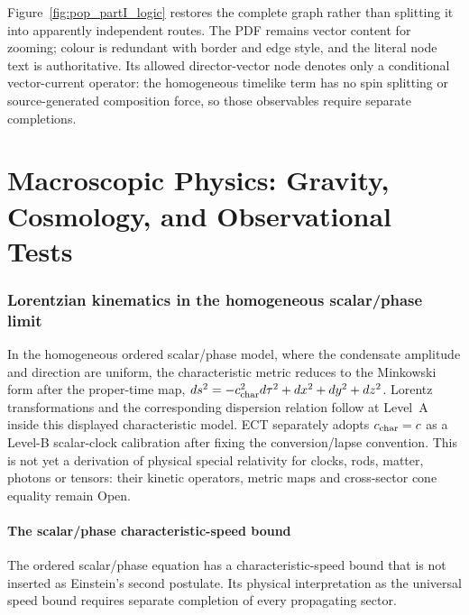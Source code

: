 \documentclass[11pt,a4paper]{article}
\begin{document}
Figure~\ref{fig:pop_partI_logic} restores the complete graph rather than
splitting it into apparently independent routes.  The PDF remains vector
content for zooming; colour is redundant with border and edge style, and the
literal node text is authoritative.  Its allowed director-vector node denotes
only a conditional vector-current operator: the homogeneous timelike term has
no spin splitting or source-generated composition force, so those observables
require separate completions.

\clearpage

\clearpage

\part{Macroscopic Physics: Gravity, Cosmology, and Observational Tests}
\label{part:macro_pop}

\section{Lorentzian kinematics in the homogeneous scalar/phase limit}

In the homogeneous ordered scalar/phase model, where the condensate amplitude
and direction are uniform, the characteristic metric reduces to the Minkowski
form after the proper-time map,
$ds^2=-c_{\rm char}^2d\tau^2+dx^2+dy^2+dz^2$.  Lorentz transformations and
the corresponding dispersion relation follow at Level~A inside this displayed
characteristic model.  ECT separately adopts $c_{\rm char}=c$ as a Level-B
scalar-clock calibration after fixing the conversion/lapse convention.  This
is not yet a derivation of physical special relativity for clocks, rods,
matter, photons or tensors: their kinetic operators, metric maps and
cross-sector cone equality remain Open.

\subsection{The scalar/phase characteristic-speed bound}

The ordered scalar/phase equation has a characteristic-speed bound that is not inserted as Einstein's second postulate. Its physical interpretation as the universal speed bound requires separate completion of every propagating sector.
\end{document}
